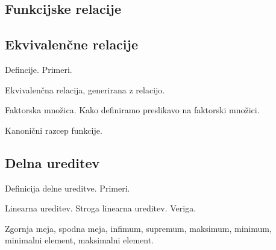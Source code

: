 \subsection{Funkcijske relacije}
\label{sub:funkcijske_relacije}


\subsection{Ekvivalenčne relacije}
\label{sub:ekvivalencne_relacije}






Defincije. Primeri.

Ekvivalenčna relacija, generirana z relacijo.

Faktorska množica. Kako definiramo preslikavo na faktorski množici.

Kanonični razcep funkcije.

\subsection{Delna ureditev}
\label{sub:delna_ureditev}

Definicija delne ureditve. Primeri.

Linearna ureditev. Stroga linearna ureditev. Veriga.

Zgornja meja, spodna meja, infimum, supremum, maksimum, minimum, minimalni element, maksimalni element.



